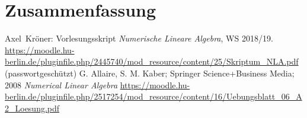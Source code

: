 \documentclass[smallheadings]{scrartcl}
\numberwithin{equation}{section}
\begin{document}
\section{Zusammenfassung}




\begin{thebibliography}{9}
 Axel~Kröner: Vorlesungsskript \textit{Numerische Lineare Algebra}, WS 2018/19. 
\url{https://moodle.hu-berlin.de/pluginfile.php/2445740/mod_resource/content/25/Skriptum_NLA.pdf} (passwortgeschützt)
 G. Allaire, S. M. Kaber; Springer Science+Business Media; 2008 \textit{Numerical Linear Algebra}
\url{https://moodle.hu-berlin.de/pluginfile.php/2517254/mod_resource/content/16/Uebungsblatt_06_A2_Loesung.pdf}
\end{thebibliography}


\end{document}
